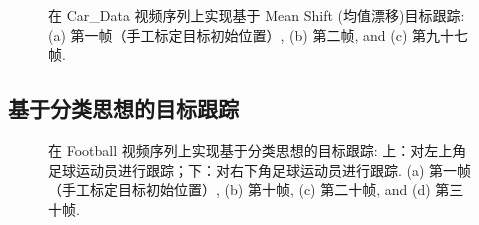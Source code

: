 \begin{figure}[!ht]
  \centering
  \begin{minipage}[b]{\linewidth} 

  \end{minipage}
  \vfill
  \caption{在 Car\_Data 视频序列上实现基于 Mean Shift (均值漂移)目标跟踪: (a) 第一帧（手工标定目标初始位置）, (b) 第二帧, and (c) 第九十七帧.}
  \label{fig:compare}
\end{figure}

\subsection{基于分类思想的目标跟踪}

\begin{figure}[!ht]
  \centering
  \begin{minipage}[b]{\linewidth} 

  \end{minipage}
  \vfill
  \caption{在 Football 视频序列上实现基于分类思想的目标跟踪: 上：对左上角足球运动员进行跟踪；下：对右下角足球运动员进行跟踪. (a) 第一帧（手工标定目标初始位置）, (b) 第十帧, (c) 第二十帧, and (d) 第三十帧.}
  \label{fig:football_result}
\end{figure}



